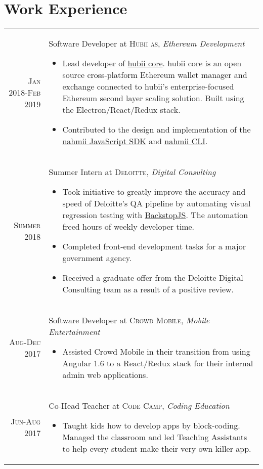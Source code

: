 \documentclass[a4paper,10pt]{article}
\begin{document}
\section{Work Experience}
\begin{tabular}{r|p{13.5cm}}
    \textsc{Jan 2018-Feb 2019} & Software Developer at \textsc{Hubii as}, \emph{Ethereum Development}\footnotesize{
    \begin{itemize}
        \item Lead developer of \href{https://github.com/hubiinetwork/hubii-core}{hubii core}. hubii core is an open source cross-platform Ethereum wallet manager and exchange connected to hubii's enterprise-focused Ethereum second layer scaling solution. Built using the Electron/React/Redux stack.
        \item Contributed to the design and implementation of the \href{https://github.com/hubiinetwork/nahmii-sdk}{nahmii JavaScript SDK} and \href{https://github.com/hubiinetwork/nahmii-cli}{nahmii CLI}.
    \end{itemize}}\\

    \textsc{Summer 2018} & Summer Intern at \textsc{Deloitte}, \emph{Digital Consulting}\footnotesize{
    \begin{itemize}
        \item Took initiative to greatly improve the accuracy and speed of Deloitte's QA pipeline by automating visual regression testing with \href{https://github.com/garris/BackstopJS}{BackstopJS}. The automation freed hours of weekly developer time. 
        \item Completed front-end development tasks for a major government agency.
        \item Received a graduate offer from the Deloitte Digital Consulting team as a result of a positive review.
    \end{itemize}}\\
    \textsc{Aug-Dec 2017} & Software Developer at \textsc{Crowd Mobile}, \emph{Mobile Entertainment}\footnotesize{
    \begin{itemize}
        \item  Assisted Crowd Mobile in their transition from using Angular 1.6 to a React/Redux stack for their internal admin web applications.
    \end{itemize}
    }\\
    \textsc{Jun-Aug 2017} & Co-Head Teacher at \textsc{Code Camp}, \emph{Coding Education}\footnotesize{
    \begin{itemize}
        \item  Taught kids how to develop apps by block-coding. Managed the classroom and led Teaching Assistants to help every student make their very own killer app.
    \end{itemize}}
\end{tabular}
\end{document}
